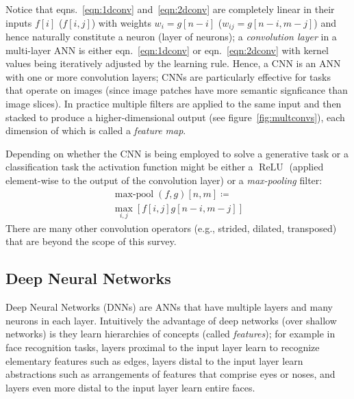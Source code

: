 Notice that eqns.~\eqref{eqn:1dconv} and~\eqref{eqn:2dconv} are completely linear in their inputs \(f[i]\) (\(f[i,j]\)) with weights \(w_i = g[n-i]\) (\(w_{ij} = g[n-i, m-j]\)) and hence naturally constitute a neuron (layer of neurons); a \textit{convolution layer} in a multi-layer ANN is either eqn.~\eqref{eqn:1dconv} or eqn.~\eqref{eqn:2dconv} with kernel values being iteratively adjusted by the learning rule.
%
Hence, a CNN is an ANN with one or more convolution layers; CNNs are particularly effective for tasks that operate on images (since image patches have more semantic signficance than image slices).
%
In practice multiple filters are applied to the same input and then stacked to produce a higher-dimensional output (see figure~\ref{fig:multconvs}), each dimension of which is called a \textit{feature map}.

%
Depending on whether the CNN is being employed to solve a generative task or a classification task the activation function might be either a \(\operatorname{ReLU}\) (applied element-wise to the output of the convolution layer) or a \textit{max-pooling} filter:
\begin{multline}
\operatorname{max-pool}(f,g)[n, m]\coloneqq\\ \max_{i,j}\left[ f[i, j]g[n-i, m-j] \right]
\label{eqn:2dpool}
\end{multline}
There are many other convolution operators (e.g., strided, dilated, transposed) that are beyond the scope of this survey\cite{dumoulin2016guide}.

\subsection{Deep Neural Networks}

%
Deep Neural Networks (DNNs) are ANNs that have multiple layers and many neurons in each layer.
%
Intuitively the advantage of deep networks (over shallow networks) is they learn hierarchies of concepts (called \textit{features}); for example in face recognition tasks, layers proximal to the input layer learn to recognize elementary features such as edges, layers distal to the input layer learn abstractions such as arrangements of features that comprise eyes or noses, and layers even more distal to the input layer learn entire faces. 

